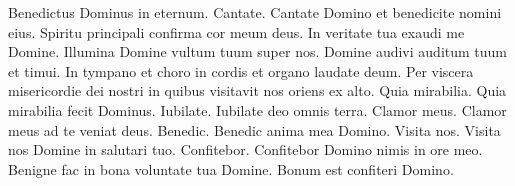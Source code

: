 \begin{multicols*}{2}
 Benedictus Dominus in eternum.
 Cantate.
 Cantate Domino et benedicite nomini eius.
 Spiritu principali confirma cor meum deus.
 In veritate tua exaudi me Domine.
 Illumina Domine vultum tuum super nos.
 Domine audivi auditum tuum et timui.
 In tympano et choro in cordis et organo laudate deum.
 Per viscera misericordie dei nostri in quibus visitavit nos oriens ex alto.
 Quia mirabilia.
 Quia mirabilia fecit Dominus.
 Iubilate.
 Iubilate deo omnis terra.
 Clamor meus.
 Clamor meus ad te veniat deus.
 Benedic.
 Benedic anima mea Domino.
 Visita nos.
 Visita nos Domine in salutari tuo.
 Confitebor.
 Confitebor Domino nimis in ore meo.
 Benigne fac in bona voluntate tua Domine.
 Bonum est confiteri Domino.

\end{multicols*}
